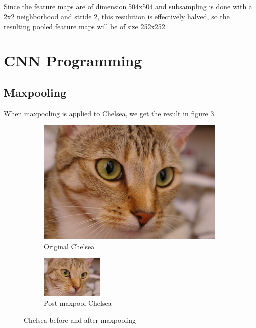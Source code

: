 \documentclass[]{article}
\begin{document}
\subsection{}
Since the feature maps are of dimension 504x504 and subsampling is done with a 2x2 neighborhood and stride 2, this resulution is effectively halved, so the resulting pooled feature maps will be of size 252x252.

\section{CNN Programming}
\subsection{Maxpooling}
When maxpooling is applied to Chelsea, we get the result in figure \ref{fig:chelsea}.
\begin{figure}[H]
     \centering
     \begin{subfigure}[b]{0.6\textwidth}
         \centering
         \includegraphics[width=\textwidth]{chelsea}
         \caption{Original Chelsea}
         \label{fig:chelsea_before}
     \end{subfigure}
     \hfill
     \begin{subfigure}[b]{0.3\textwidth}
         \centering
         \includegraphics[width=\textwidth]{chelsea_maxpooled}
         \caption{Post-maxpool Chelsea}
         \label{fig:chelsea_after}
     \end{subfigure}
    \caption{Chelsea before and after maxpooling}
    \label{fig:chelsea}
\end{figure}
\end{document}
